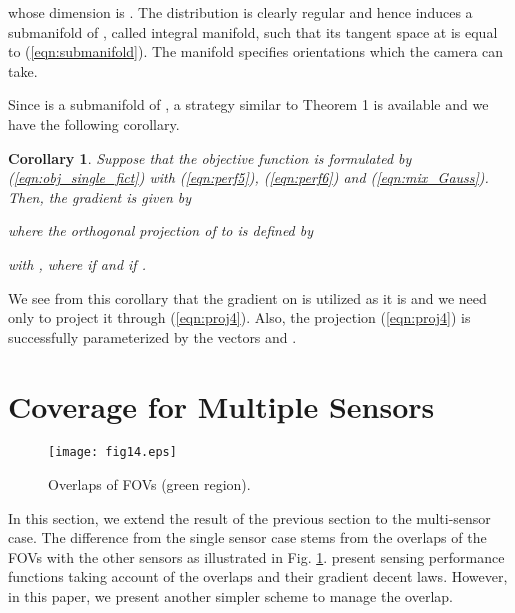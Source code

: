 \documentclass[conference,letterpaper]{ieeeconf}
\newtheorem{corollary}{Corollary}
\begin{document}
whose dimension is .
The distribution  is clearly regular and hence 
induces a submanifold  of  \cite{MLS_BK},
called integral manifold, such that its tangent space 
 at  is equal to (\ref{eqn:submanifold}).
The manifold  specifies 
orientations which the camera can take.



Since  is a submanifold of ,
a strategy similar to Theorem 1 is available and
we have the following corollary.




\begin{corollary}
Suppose that the objective function  is formulated by (\ref{eqn:obj_single_fict})
with (\ref{eqn:perf5}), (\ref{eqn:perf6}) and (\ref{eqn:mix_Gauss}).
Then, the gradient  
is given by 

where the orthogonal projection  of
 to  is defined by

with 
, where  if  and
 if .
\end{corollary}




We see from this corollary  
that the gradient
 on  
is utilized as it is and we need only to project it
through (\ref{eqn:proj4}).
Also, the projection (\ref{eqn:proj4}) is successfully 
parameterized by the vectors  and .







\section{Coverage for Multiple Sensors}



\begin{figure}[t]
\begin{center}
\texttt{[image: fig14.eps]}
\caption{Overlaps of FOVs (green region).}
\label{fig:overlap}
\end{center}
\end{figure}




In this section, we extend the result of the previous section to the
multi-sensor case.
The difference from the single sensor case stems from the overlaps
of the FOVs with the other sensors as illustrated in Fig. \ref{fig:overlap}.
\cite{EYE,CL_EJC05,BCM_ES05} present sensing performance functions
taking account of the overlaps and their gradient decent laws.
However, in this paper, we present another simpler scheme to manage the overlap.
\end{document}
